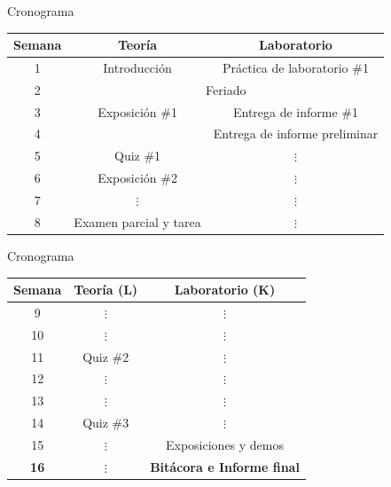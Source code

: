 \documentclass[xcolor=dvipsnames]{beamer}
\newcommand{\pageframe}[1]{\frame{\begin{center}{ \Huge #1 }\end{center}}}
\begin{document}
\pageframe{Cronograma}

\begin{frame}{Cronograma}
 \begin{center}
  \begin{tabular}{|c|c|c|}\hline
   Semana & \multicolumn{1}{c|}{Teoría} & \multicolumn{1}{c|}{Laboratorio} \\ \hline \hline
   1 & Introducción & Práctica de laboratorio \#1 \\ \hline
   2 & \multicolumn{2}{c|}{Feriado} \\ \hline
   3 & Exposición \#1 & Entrega de informe \#1 \\ \hline
   4 &  & Entrega de informe preliminar \\ \hline
   5 & Quiz \#1 & \multicolumn{1}{c|}{$\vdots$}     \\ \hline
   6 & Exposición \#2 & \multicolumn{1}{c|}{$\vdots$}     \\ \hline
   7 & \multicolumn{1}{c|}{$\vdots$} & \multicolumn{1}{c|}{$\vdots$}     \\ \hline
   8 & Examen parcial y tarea & \multicolumn{1}{c|}{$\vdots$}     \\ \hline
  \end{tabular}
 \end{center}
\end{frame}

\begin{frame}{Cronograma}
 \begin{center}
  \begin{tabular}{|c|c|c|}\hline
   Semana & \multicolumn{1}{c|}{Teoría (L)} & \multicolumn{1}{c|}{Laboratorio (K)} \\ \hline \hline

   9 & \multicolumn{1}{c|}{$\vdots$} & \multicolumn{1}{c|}{$\vdots$}     \\ \hline
   10 & \multicolumn{1}{c|}{$\vdots$} & \multicolumn{1}{c|}{$\vdots$}     \\ \hline
   11 & Quiz \#2 & \multicolumn{1}{c|}{$\vdots$}     \\ \hline
   12 & \multicolumn{1}{c|}{$\vdots$} & \multicolumn{1}{c|}{$\vdots$} \\ \hline
   13 & \multicolumn{1}{c|}{$\vdots$} & \multicolumn{1}{c|}{$\vdots$} \\ \hline
   14 & Quiz \#3 & \multicolumn{1}{c|}{$\vdots$}  \\\hline
   15 & \multicolumn{1}{c|}{$\vdots$} & Exposiciones y demos  \\ \hline
   \textbf{16} & \multicolumn{1}{c|}{$\vdots$} & \textbf{Bitácora e Informe final} \\ \hline
  \end{tabular}

 \end{center}

\end{frame}
\end{document}
